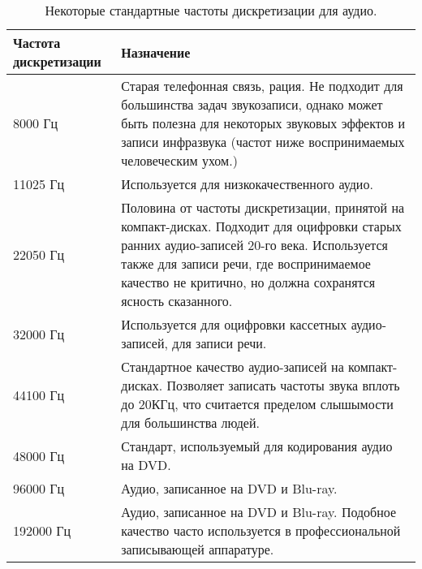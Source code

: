 \documentclass[../sparc.tex]{subfiles}
\begin{document}
\begin{table}[h]
  \centering
  \begin{tabular}{p{2cm}|p{9cm}}
    Частота дискретизации & Назначение \\
    \hline \hline

    8000 Гц & Старая телефонная связь, рация.  Не подходит для большинства задач
    звукозаписи, однако может быть полезна для некоторых звуковых эффектов и
    записи инфразвука (частот ниже воспринимаемых человеческим ухом.) \\

    \hline

    11025 Гц & Используется для низкокачественного аудио. \\

    \hline

    22050 Гц & Половина от частоты дискретизации, принятой на компакт-дисках.
    Подходит для оцифровки старых ранних аудио-записей 20-го века.  Используется
    также для записи речи, где воспринимаемое качество не критично, но должна
    сохранятся ясность сказанного. \\

    \hline

    32000 Гц & Используется для оцифровки кассетных аудио-записей, для записи
    речи. \\

    \hline

    44100 Гц & Стандартное качество аудио-записей на компакт-дисках.  Позволяет
    записать частоты звука вплоть до 20КГц, что считается пределом слышымости
    для большинства людей. \\

    \hline

    48000 Гц & Стандарт, используемый для кодирования аудио на DVD. \\

    \hline

    96000 Гц & Аудио, записанное на DVD и Blu-ray. \\

    \hline

    192000 Гц & Аудио, записанное на DVD и Blu-ray.  Подобное качество часто
    используется в профессиональной записывающей аппаратуре. \\

    \hline

  \end{tabular}
  \caption{Некоторые стандартные частоты дискретизации для аудио.}
  \label{table:adc-sound-sampling-rate-1}
\end{table}
\end{document}
